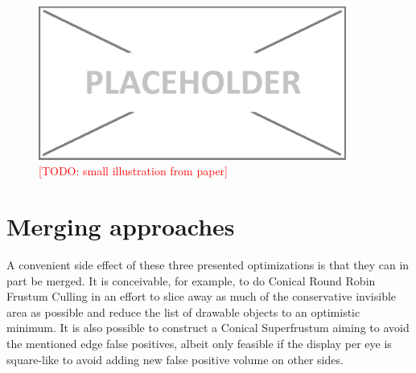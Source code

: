\begin{figure}[htb]
  \centering
  \includegraphics[width=0.9\textwidth]{pictures/placeholder}
  \caption{\textcolor{red}{[TODO: small illustration from paper]}} \label{fig:blob}
\end{figure}

\section{Merging approaches}
A convenient side effect of these three presented optimizations is that they can in part be merged. It is conceivable, for example, to do Conical Round Robin Frustum Culling in an effort to slice away as much of the conservative invisible area as possible and reduce the list of drawable objects to an optimistic minimum. It is also possible to construct a Conical Superfrustum aiming to avoid the mentioned edge false positives, albeit only feasible if the display per eye is square-like to avoid adding new false positive volume on other sides.
